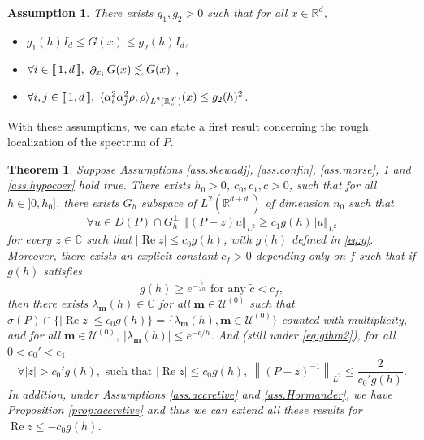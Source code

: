 \documentclass[12pt]{amsart}
\renewcommand{\Re}{\operatorname{Re}}
\newcommand{\C}{\mathbb C}
\newcommand{\R}{\mathbb R}
\def\<{\langle}
\def\>{\rangle}
\numberwithin{equation}{section}
\numberwithin{figure}{section}
\def\m{\mathbf{m}}
\DeclareMathOperator{\p}{\partial}
\newcommand{\vvert}[1]{\left\lVert#1\right\rVert}
\newcommand{\lb}{\operatorname{[\negthinspace [}}
\newcommand{\rb}{\operatorname{]\negthinspace ]}}
\newtheorem{theorem}{Theorem}
\newtheorem{assumption}{Assumption}
\def\uuu{{\mathcal U}}\def\vvv{{\mathcal V}}\def\www{{\mathcal W}}\def\xxx{{\mathcal X}}
\begin{document}
\begin{assumption}\label{ass.G}
    There exists $g_1,g_2>0$ such that for all $x\in\R^d$,
    \begin{itemize}
        \item[$i)$] $g_1(h)I_{d} \leq G(x) \leq g_2(h)I_{d}$,
        \item[$ii)$] $\forall i\in\lb1,d\rb,\ \p_{x_i}G(x) \lesssim G(x)$%
,
        \item[$iii)$] $\forall i,j\in\lb1,d\rb,\ \<\alpha_i^2\alpha_j^2\rho,\rho\>_{L^2(\R_v^{d'})}(x) \leq g_2(h)^2$.
    \end{itemize}
\end{assumption}

With these assumptions, we can state a first result concerning the %
rough localization of the spectrum of $P$.

\begin{theorem}\label{thm:1}
Suppose Assumptions \ref{ass.skewadj}, \ref{ass.confin}, \ref{ass.morse}, \ref{ass.G} and \ref{ass.hypocoer} hold true. There exists $h_0>0$, $c_0,c_1,c>0$, such that for all $h\in]0,h_0]$, there exists $G_h$ subspace of $L^2(\R^{d+d'})$ of dimension $n_0$ such that
$$
\forall u\in D(P)\cap G_h^\bot\ \ \Vert (P-z)u\Vert_{L^2}\geq c_1g(h)\Vert u\Vert_{L^2}
$$
for every $z\in\C$ such that $|\Re z|\leq c_0g(h)$, with $g(h)$ defined in \eqref{eq:g}. Moreover, there exists an explicit constant $c_f>0$ depending only on $f$ such that if $g(h)$ satisfies
\begin{equation}\label{eq:gthm2}
g(h)\geq e^{-\frac{\tilde c}{2h}}\mbox{ for any } \tilde c<c_f,
\end{equation}
then there exists $\lambda_\m(h)\in\C$ for all $\m\in\uuu^{(0)}$ such that $\sigma(P)\cap\{|\Re z|\leq c_0g(h)\}=\{\lambda_\m(h),\m\in\uuu^{(0)}\}$ counted with multiplicity, and for all $\m\in\uuu^{(0)},\ |\lambda_\m(h)|\leq e^{-c/h}$. And (still under \eqref{eq:gthm2}), for all $0<c_0'<c_1$
\begin{equation*}
\forall |z|>c_0'g(h),\mbox{ such that }|\Re z|\leq c_0g(h),\ \vvert{(P-z)^{-1}}_{L^2}\leq\frac{2}{c_0'g(h)}.
\end{equation*}
In addition, under Assumptions \ref{ass.accretive} and \ref{ass.Hormander}, we have Proposition \ref{prop:accretive} and thus we can extend all these results for $\Re z \leq -c_0g(h)$.
\end{theorem}
\end{document}
